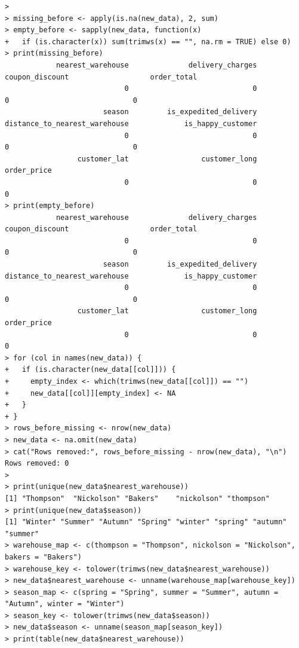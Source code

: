 \documentclass[12pt, a4paper]{article}
\begin{document}
\begin{lstlisting}
> 
> missing_before <- apply(is.na(new_data), 2, sum)
> empty_before <- sapply(new_data, function(x)
+   if (is.character(x)) sum(trimws(x) == "", na.rm = TRUE) else 0)
> print(missing_before)
            nearest_warehouse              delivery_charges               coupon_discount                   order_total 
                            0                             0                             0                             0 
                       season         is_expedited_delivery distance_to_nearest_warehouse             is_happy_customer 
                            0                             0                             0                             0 
                 customer_lat                 customer_long                   order_price 
                            0                             0                             0 
> print(empty_before)
            nearest_warehouse              delivery_charges               coupon_discount                   order_total 
                            0                             0                             0                             0 
                       season         is_expedited_delivery distance_to_nearest_warehouse             is_happy_customer 
                            0                             0                             0                             0 
                 customer_lat                 customer_long                   order_price 
                            0                             0                             0 
> for (col in names(new_data)) {
+   if (is.character(new_data[[col]])) {
+     empty_index <- which(trimws(new_data[[col]]) == "")
+     new_data[[col]][empty_index] <- NA
+   }
+ }
> rows_before_missing <- nrow(new_data)
> new_data <- na.omit(new_data)
> cat("Rows removed:", rows_before_missing - nrow(new_data), "\n")
Rows removed: 0 
> 
> print(unique(new_data$nearest_warehouse))
[1] "Thompson"  "Nickolson" "Bakers"    "nickolson" "thompson" 
> print(unique(new_data$season))
[1] "Winter" "Summer" "Autumn" "Spring" "winter" "spring" "autumn" "summer"
> warehouse_map <- c(thompson = "Thompson", nickolson = "Nickolson", bakers = "Bakers")
> warehouse_key <- tolower(trimws(new_data$nearest_warehouse))
> new_data$nearest_warehouse <- unname(warehouse_map[warehouse_key])
> season_map <- c(spring = "Spring", summer = "Summer", autumn = "Autumn", winter = "Winter")
> season_key <- tolower(trimws(new_data$season))
> new_data$season <- unname(season_map[season_key])
> print(table(new_data$nearest_warehouse))


\end{lstlisting}
\end{document}
